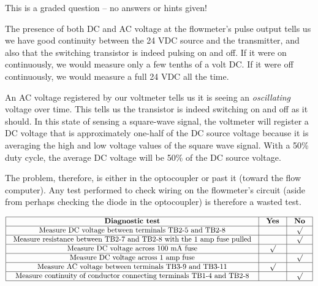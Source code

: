 \vfil 

\eject






This is a graded question -- no answers or hints given!








The presence of both DC and AC voltage at the flowmeter's pulse output tells us we have good continuity between the 24 VDC source and the transmitter, and also that the switching transistor is indeed pulsing on and off.  If it were on continuously, we would measure only a few tenths of a volt DC.  If it were off continuously, we would measure a full 24 VDC all the time.

An AC voltage registered by our voltmeter tells us it is seeing an {\it oscillating} voltage over time.  This tells us the transistor is indeed switching on and off as it should.  In this state of sensing a square-wave signal, the voltmeter will register a DC voltage that is approximately one-half of the DC source voltage because it is averaging the high and low voltage values of the square wave signal.  With a 50\% duty cycle, the average DC voltage will be 50\% of the DC source voltage.

\vskip 10pt

The problem, therefore, is either in the optocoupler or past it (toward the flow computer).  Any test performed to check wiring on the flowmeter's circuit (aside from perhaps checking the diode in the optocoupler) is therefore a wasted test.


$$\vbox{\offinterlineskip
\halign{\strut
\vrule \quad\hfil # \ \hfil & 
\vrule \quad\hfil # \ \hfil & 
\vrule \quad\hfil # \ \hfil \vrule \cr
\noalign{\hrule}
%
{\bf Diagnostic test} & {\bf Yes} & {\bf No} \cr
%
\noalign{\hrule}
%
Measure DC voltage between terminals TB2-5 and TB2-8 &  & $\surd$ \cr
%
\noalign{\hrule}
%
Measure resistance between TB2-7 and TB2-8 with the 1 amp fuse pulled &  & $\surd$ \cr
%
\noalign{\hrule}
%
Measure DC voltage across 100 mA fuse & $\surd$ &  \cr
%
\noalign{\hrule}
%
Measure DC voltage across 1 amp fuse &  & $\surd$ \cr
%
\noalign{\hrule}
%
Measure AC voltage between terminals TB3-9 and TB3-11 & $\surd$ &  \cr
%
\noalign{\hrule}
%
Measure continuity of conductor connecting terminals TB1-4 and TB2-8 &  & $\surd$ \cr
%
\noalign{\hrule}
} %
}$$ %

